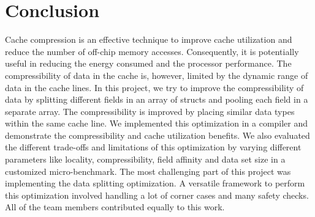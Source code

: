 \section{Conclusion}
\label{sec:conc}
Cache compression is an effective technique to improve cache utilization and reduce the number of off-chip memory accesses. Consequently, it is potentially useful in reducing the energy consumed and the processor performance. The compressibility of data in the cache is, however, limited by the dynamic range of data in the cache lines. In this project, we try to improve the compressibility of data by splitting different fields in an array of structs and pooling each field in a separate array. The compressibility is improved by placing similar data types within the same cache line. We implemented this optimization in a compiler and demonstrate the compressibility and cache utilization benefits. We also evaluated the different trade-offs and limitations of this optimization by varying different parameters like locality, compressibility, field affinity and data set size in a customized micro-benchmark. 
The most challenging part of this project was implementing the data splitting optimization. A versatile framework to perform this optimization involved handling a lot of corner cases and many safety checks. All of the team members contributed equally to this work.  


